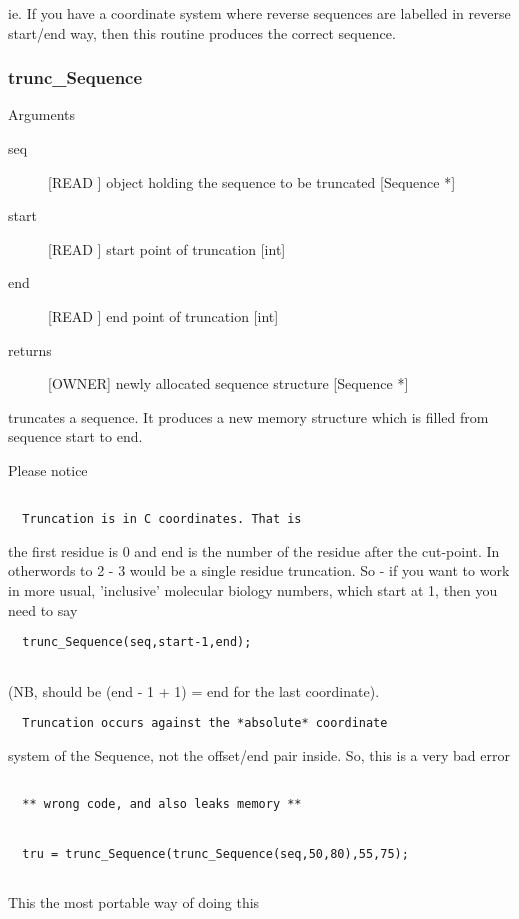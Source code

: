 ie. If you have a coordinate system where reverse 
sequences are labelled in reverse start/end way,
then this routine produces the correct sequence.


\subsubsection{trunc_Sequence}

Arguments
\begin{description}
\item[seq] [READ ] object holding the sequence to be truncated [Sequence *]
\item[start] [READ ] start point of truncation [int]
\item[end] [READ ] end point of truncation [int]
\item[returns] [OWNER] newly allocated sequence structure [Sequence *]
\end{description}
truncates a sequence. It produces a new memory structure
which is filled from sequence start to end.


Please notice
\begin{verbatim}
  
  Truncation is in C coordinates. That is
\end{verbatim}
the first residue is 0 and end is the number of the
residue after the cut-point. In otherwords to 
2 - 3 would be a single residue truncation. So - if
you want to work in more usual, 'inclusive' molecular
biology numbers, which start at 1, then you need to say


\begin{verbatim}
  trunc_Sequence(seq,start-1,end);


\end{verbatim}
(NB, should be (end - 1 + 1) = end for the last coordinate).


\begin{verbatim}
  Truncation occurs against the *absolute* coordinate
\end{verbatim}
system of the Sequence, not the offset/end pair inside.
So, this is a very bad error
\begin{verbatim}
 
  ** wrong code, and also leaks memory **


  tru = trunc_Sequence(trunc_Sequence(seq,50,80),55,75); 


\end{verbatim}
This the most portable way of doing this


